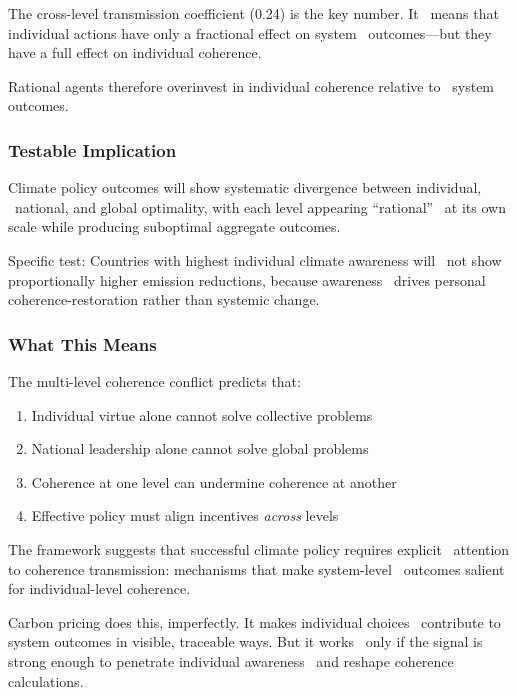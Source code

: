 The cross-level transmission coefficient (0.24) is the key number. It \
means that individual actions have only a fractional effect on system \
outcomes---but they have a full effect on individual coherence.

Rational agents therefore overinvest in individual coherence relative to \
system outcomes.

\subsubsection{Testable Implication}

\begin{tcolorbox}[colback=blue!5!white, colframe=blue!75!black, title=Prediction 7: Multi-Level Conflict]
Climate policy outcomes will show systematic divergence between individual, \
national, and global optimality, with each level appearing ``rational'' \
at its own scale while producing suboptimal aggregate outcomes.
\end{tcolorbox}

Specific test: Countries with highest individual climate awareness will \
not show proportionally higher emission reductions, because awareness \
drives personal coherence-restoration rather than systemic change.

\subsubsection{What This Means}

The multi-level coherence conflict predicts that:

\begin{enumerate}
    \item Individual virtue alone cannot solve collective problems
    \item National leadership alone cannot solve global problems
    \item Coherence at one level can undermine coherence at another
    \item Effective policy must align incentives \emph{across} levels
\end{enumerate}

The framework suggests that successful climate policy requires explicit \
attention to coherence transmission: mechanisms that make system-level \
outcomes salient for individual-level coherence.

Carbon pricing does this, imperfectly. It makes individual choices \
contribute to system outcomes in visible, traceable ways. But it works \
only if the signal is strong enough to penetrate individual awareness \
and reshape coherence calculations.

